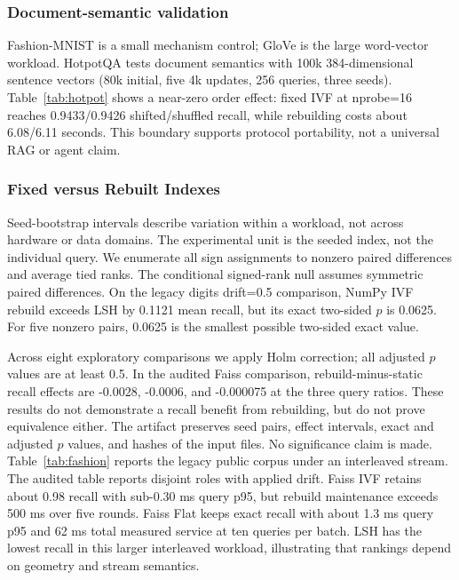 \subsubsection{Document-semantic validation}
Fashion-MNIST is a small mechanism control; GloVe is the large word-vector workload.
HotpotQA tests document semantics with 100k 384-dimensional sentence vectors (80k initial,
five 4k updates, 256 queries, three seeds). Table~\ref{tab:hotpot} shows a near-zero
order effect: fixed IVF at nprobe=16 reaches 0.9433/0.9426 shifted/shuffled recall,
while rebuilding costs about 6.08/6.11 seconds. This boundary supports protocol
portability, not a universal RAG or agent claim.


\subsubsection{Fixed versus Rebuilt Indexes}

Seed-bootstrap intervals describe variation within a workload, not across hardware or
data domains. The experimental unit is the seeded index, not the individual query.
We enumerate all sign assignments to nonzero paired differences and average tied ranks.
The conditional signed-rank null assumes symmetric paired differences. On the legacy
digits drift=0.5 comparison, NumPy IVF rebuild exceeds LSH by 0.1121 mean recall,
but its exact two-sided $p$ is 0.0625.
For five nonzero pairs, 0.0625 is the smallest possible two-sided exact value.

Across eight exploratory comparisons we apply Holm correction; all adjusted $p$ values
are at least 0.5. In the audited Faiss comparison, rebuild-minus-static recall effects
are -0.0028, -0.0006, and -0.000075 at the three query ratios. These results do not
demonstrate a recall benefit from rebuilding, but do not prove equivalence either.
The artifact preserves seed pairs, effect intervals, exact and adjusted $p$ values,
and hashes of the input files. No significance claim is made.
Table~\ref{tab:fashion} reports the legacy public corpus under an interleaved stream.
The audited table reports disjoint roles with applied drift. Faiss IVF retains about
0.98 recall with sub-0.30 ms query p95, but rebuild maintenance exceeds 500 ms over
five rounds. Faiss Flat keeps exact recall with about 1.3 ms query p95 and 62 ms total
measured service at ten queries per batch. LSH has the lowest recall in this larger
interleaved workload, illustrating that rankings depend on geometry and stream semantics.

